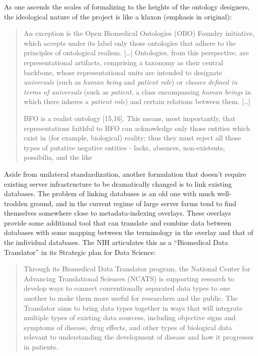 \documentclass[10pt]{article}
\begin{document}
\begin{multicols}{2}
As one ascends the scales of formalizing to the heights of the ontology
designers, the ideological nature of the project is like a klaxon
(emphasis in original):

\begin{quote}
An exception is the Open Biomedical Ontologies (OBO) Foundry initiative,
which accepts under its label only those ontologies that adhere to the
principles of ontological realism. {[}\ldots{]} Ontologies, from this
perspective, are representational artifacts, comprising a taxonomy as
their central backbone, whose representational units are intended to
designate \emph{universals} (such as \emph{human being} and
\emph{patient role}) or \emph{classes defined in terms of universals}
(such as \emph{patient,} a class encompassing \emph{human beings} in
which there inheres a \emph{patient role}) and certain relations between
them. {[}\ldots{]}

BFO is a realist ontology {[}15,16{]}. This means, most importantly,
that representations faithful to BFO can acknowledge only those entities
which exist in (for example, biological) reality; thus they must reject
all those types of putative negative entities - lacks, absences,
non-existents, possibilia, and the like \cite{ceustersFoundationsRealistOntology2010} 
\end{quote}

Aside from unilateral standardization, another formulation that doesn't
require existing server infrastructure to be dramatically changed is to
link existing databases. The problem of linking databases is an old one
with much well-trodden ground, and in the current regime of large server
farms tend to find themselves somewhere close to metadata-indexing
overlays. These overlays provide some additional tool that can translate
and combine data between databases with some mapping between the
terminology in the overlay and that of the individual databases. The NIH
articulates this as a ``Biomedical Data Translator'' in its Strategic
plan for Data Science:

\begin{quote}
Through its Biomedical Data Translator program, the National Center for
Advancing Translational Sciences (NCATS) is supporting research to
develop ways to connect conventionally separated data types to one
another to make them more useful for researchers and the public. The
Translator aims to bring data types together in ways that will integrate
multiple types of existing data sourcess, including objective signs and
symptoms of disease, drug effects, and other types of biological data
relevant to understanding the development of disease and how it
progresses in patients. \cite{NIHStrategicPlan2018} 
\end{quote}


\end{multicols}
\end{document}
